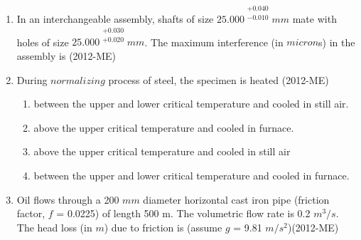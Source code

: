 \documentclass[journal,12pt,twocolumn]{IEEEtran}
\theoremstyle{remark}
\begin{document}
\begin{enumerate}
\item In an interchangeable assembly, shafts of size ${25.000}^{\begin{matrix} +0.040 \\ -0.010 \end{matrix}} mm$ mate with holes of size ${25.000}^{\begin{matrix}    +0.030 \\ +0.020 \end{matrix}} mm$. The maximum interference (in $micron$s) in the assembly is \hfill{(2012-ME)} 
                 \begin{enumerate}   
                         \end{enumerate}





\item During $normalizing$ process of steel, the specimen is heated \hfill{(2012-ME)}
\begin{enumerate}
\item  between the upper and lower critical temperature and cooled in still air.
\item  above the upper critical temperature and cooled in furnace.
\item  above the upper critical temperature and cooled in still air
\item  between the upper and lower critical temperature and cooled in furnace.
\end{enumerate}

\item Oil flows through a 200 $mm$ diameter horizontal cast iron pipe (friction factor, $f$ = 0.0225) of length 500 m. The volumetric flow rate is 0.2 $m^3/s$. The head loss (in $m$) due to friction is (assume $g$ = 9.81 $m/s^2$)\hfill{(2012-ME)}
\begin{enumerate}
\end{enumerate}



\end{enumerate}
\end{document}
